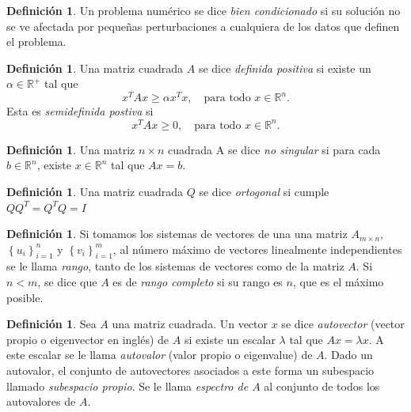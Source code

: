\documentclass[11pt,a4paper]{book}
\theoremstyle{definition}
\newtheorem{definition}[theorem]{Definición}
\theoremstyle{remark}
\newcommand{\sucesion}[1]{\left\{#1\right\}}
\begin{document}
\begin{definition}
	Un problema numérico se dice \textit{bien condicionado} si su solución no se ve afectada por pequeñas perturbaciones a cualquiera de los datos que definen el problema.
\end{definition}

\begin{definition}
	Una matriz cuadrada $A$ se dice \textit{definida positiva} si existe un $\alpha \in \mathbb{R}^+$ tal que
	\begin{equation}
		x^TAx \geq \alpha x^T x, \quad \text{para todo } x \in \mathbb{R}^n.
	\end{equation}
	Esta es \textit{semidefinida postiva} si
	\begin{equation}
		x^TAx \geq 0, \quad \text{para todo } x \in \mathbb{R}^n.
	\end{equation}
\end{definition}

\begin{definition}
	Una matriz $n \times n$ cuadrada A se dice \textit{no singular} si para cada $b \in \mathbb{R}^n$, existe $x\in\mathbb{R}^n$ tal que $Ax=b$.
\end{definition}

\begin{definition}
	Una matriz cuadrada $Q$ se dice \textit{ortogonal} si cumple $QQ^T=Q^TQ=I$
\end{definition}

\begin{definition}
	Si tomamos los sistemas de vectores de una una matriz $A_{m \times n}$, $\sucesion{u_i}_{i=1}^n$ y $\sucesion{v_i}_{i=1}^m$, al número máximo de vectores linealmente independientes se le llama \textit{rango}, tanto de los sistemas de vectores como de la matriz $A$. Si $n<m$, se dice que $A$ es de \textit{rango completo} si su rango es $n$, que es el máximo posible.
\end{definition}

\begin{definition}
	Sea $A$ una matriz cuadrada. Un vector $x$ se dice \textit{autovector} (vector propio o
	eigenvector en inglés) de $A$ si existe un
	escalar $\lambda$ tal que $Ax=\lambda x$. A este escalar se le llama \textit{autovalor} 
	(valor propio o eigenvalue) de $A$. Dado un autovalor, el conjunto de autovectores asociados
	a este forma un subespacio llamado \textit{subespacio propio}. Se le llama \textit{espectro de $A$}
	al conjunto de todos los autovalores de $A$.
\end{definition}
\end{document}
